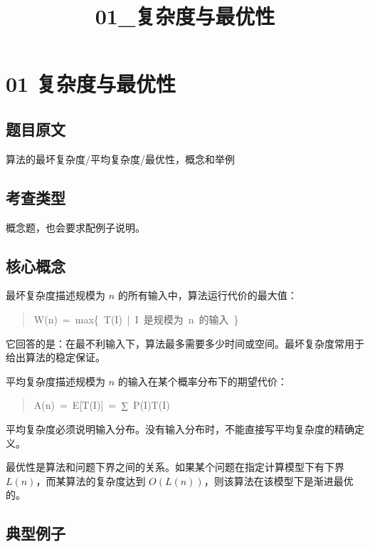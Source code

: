 \documentclass[UTF8,zihao=-4]{ctexart}
\title{01\_复杂度与最优性}
\author{}
\date{}
\begin{document}
\maketitle

\section*{01 复杂度与最优性}

\subsection*{题目原文}

算法的最坏复杂度/平均复杂度/最优性，概念和举例

\subsection*{考查类型}

概念题，也会要求配例子说明。

\subsection*{核心概念}

最坏复杂度描述规模为 $n$ 的所有输入中，算法运行代价的最大值：

\begin{quote}
\small\ttfamily\raggedright
\relax W(n)\ =\ max\{\ T(I)\ |\ I\ 是规模为\ n\ 的输入\ \}\\
\end{quote}

它回答的是：在最不利输入下，算法最多需要多少时间或空间。最坏复杂度常用于给出算法的稳定保证。

平均复杂度描述规模为 $n$ 的输入在某个概率分布下的期望代价：

\begin{quote}
\small\ttfamily\raggedright
\relax A(n)\ =\ E[T(I)]\ =\ ∑\ P(I)T(I)\\
\end{quote}

平均复杂度必须说明输入分布。没有输入分布时，不能直接写平均复杂度的精确定义。

最优性是算法和问题下界之间的关系。如果某个问题在指定计算模型下有下界 $L(n)$，而某算法的复杂度达到 $O(L(n))$，则该算法在该模型下是渐进最优的。

\subsection*{典型例子}
\end{document}
